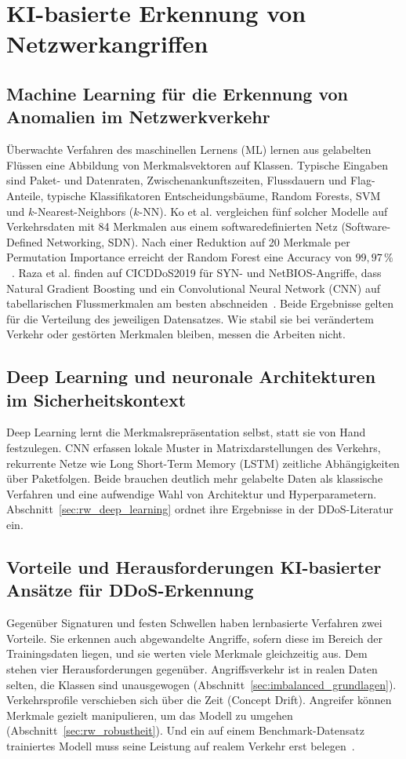 \section{KI-basierte Erkennung von Netzwerkangriffen}
\label{sec:ki_erkennung}
\subsection{Machine Learning für die Erkennung von Anomalien im Netzwerkverkehr}
Überwachte Verfahren des maschinellen Lernens (ML) lernen aus gelabelten Flüssen eine Abbildung von Merkmalsvektoren auf Klassen. Typische Eingaben sind Paket- und Datenraten, Zwischenankunftszeiten, Flussdauern und Flag-Anteile, typische Klassifikatoren Entscheidungsbäume, Random Forests, SVM und $k$-Nearest-Neighbors ($k$-NN). Ko et al. vergleichen fünf solcher Modelle auf Verkehrsdaten mit 84 Merkmalen aus einem softwaredefinierten Netz (Software-Defined Networking, SDN). Nach einer Reduktion auf 20 Merkmale per Permutation Importance erreicht der Random Forest eine Accuracy von $99{,}97\,\%$~\autocite{koComparativeStudyAIEnabled2023}. Raza et al. finden auf CICDDoS2019 für SYN- und NetBIOS-Angriffe, dass Natural Gradient Boosting und ein Convolutional Neural Network (CNN) auf tabellarischen Flussmerkmalen am besten abschneiden~\autocite{razaFeatureSelectionBasedDDoSAttack2024}. Beide Ergebnisse gelten für die Verteilung des jeweiligen Datensatzes. Wie stabil sie bei verändertem Verkehr oder gestörten Merkmalen bleiben, messen die Arbeiten nicht.

\subsection{Deep Learning und neuronale Architekturen im Sicherheitskontext}
Deep Learning lernt die Merkmalsrepräsentation selbst, statt sie von Hand festzulegen. CNN erfassen lokale Muster in Matrixdarstellungen des Verkehrs, rekurrente Netze wie Long Short-Term Memory (LSTM) zeitliche Abhängigkeiten über Paketfolgen. Beide brauchen deutlich mehr gelabelte Daten als klassische Verfahren und eine aufwendige Wahl von Architektur und Hyperparametern. Abschnitt~\ref{sec:rw_deep_learning} ordnet ihre Ergebnisse in der DDoS-Literatur ein.

\subsection{Vorteile und Herausforderungen KI-basierter Ansätze für DDoS-Erkennung}
Gegenüber Signaturen und festen Schwellen haben lernbasierte Verfahren zwei Vorteile. Sie erkennen auch abgewandelte Angriffe, sofern diese im Bereich der Trainingsdaten liegen, und sie werten viele Merkmale gleichzeitig aus. Dem stehen vier Herausforderungen gegenüber. Angriffsverkehr ist in realen Daten selten, die Klassen sind unausgewogen (Abschnitt~\ref{sec:imbalanced_grundlagen}). Verkehrsprofile verschieben sich über die Zeit (Concept Drift). Angreifer können Merkmale gezielt manipulieren, um das Modell zu umgehen (Abschnitt~\ref{sec:rw_robustheit}). Und ein auf einem Benchmark-Datensatz trainiertes Modell muss seine Leistung auf realem Verkehr erst belegen~\autocite{balaAITechniquesIoTbased2024, kumarComprehensiveReviewVulnerabilities2024}.

